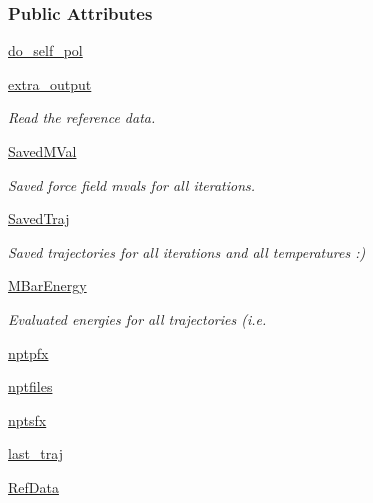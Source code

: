 \subsubsection*{Public Attributes}
\begin{DoxyCompactItemize}
\item 
\hyperlink{classforcebalance_1_1liquid_1_1Liquid_a2cf65dd56f058636e68a0b3bf2af210e}{do\-\_\-self\-\_\-pol}
\item 
\hyperlink{classforcebalance_1_1liquid_1_1Liquid_a646aeaaff46cf6a8e97f5cd5016a222f}{extra\-\_\-output}
\begin{DoxyCompactList}\small\item\em Read the reference data. \end{DoxyCompactList}\item 
\hyperlink{classforcebalance_1_1liquid_1_1Liquid_a5b9df1bf79a641156429e292f47b6afd}{Saved\-M\-Val}
\begin{DoxyCompactList}\small\item\em Saved force field mvals for all iterations. \end{DoxyCompactList}\item 
\hyperlink{classforcebalance_1_1liquid_1_1Liquid_a0da0c00cdc193c9c470d7e528043fb99}{Saved\-Traj}
\begin{DoxyCompactList}\small\item\em Saved trajectories for all iterations and all temperatures \-:) \end{DoxyCompactList}\item 
\hyperlink{classforcebalance_1_1liquid_1_1Liquid_a6c00a87ae43f535118b77d41af51a5d7}{M\-Bar\-Energy}
\begin{DoxyCompactList}\small\item\em Evaluated energies for all trajectories (i.\-e. \end{DoxyCompactList}\item 
\hyperlink{classforcebalance_1_1liquid_1_1Liquid_a0560795c55fc1b5d7668951c77ad97ab}{nptpfx}
\item 
\hyperlink{classforcebalance_1_1liquid_1_1Liquid_a2030a7e21fcce59155a0258daed4f2f7}{nptfiles}
\item 
\hyperlink{classforcebalance_1_1liquid_1_1Liquid_a4125a209929444b7cbfbd60b466dc763}{nptsfx}
\item 
\hyperlink{classforcebalance_1_1liquid_1_1Liquid_a95bb7b38b7638acba286718e55f783bb}{last\-\_\-traj}
\item 
\hyperlink{classforcebalance_1_1liquid_1_1Liquid_a472f32bbaf18b8ead19b9156f305b8fc}{Ref\-Data}

\end{DoxyCompactItemize}
